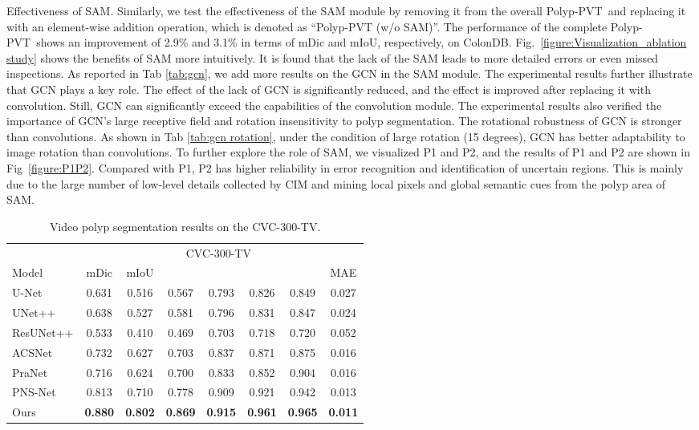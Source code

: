 \documentclass[journal]{IEEEtran}
\def\ourmodel{Polyp-PVT}
\begin{document}
\textcolor[RGB]{31,100,212}{Effectiveness of SAM.} Similarly, we test the effectiveness of the SAM module by removing it from the overall \ourmodel~and replacing it with an element-wise addition operation, which is denoted as ``Polyp-PVT (w/o SAM)''.
The performance of the complete \ourmodel~shows an improvement of 2.9\% and 3.1\% in terms of mDic and mIoU, respectively, on ColonDB.
Fig.~\ref{figure:Visualization_ablation study} shows the benefits of SAM more intuitively.
It is found that the lack of the SAM leads to more detailed errors or even missed inspections.
As reported in Tab \ref{tab:gcn}, we add more results on the GCN in the SAM module. The experimental results further illustrate that GCN plays a key role. The effect of the lack of GCN is significantly reduced, and the effect is improved after replacing it with convolution. Still, GCN can significantly exceed the capabilities of the convolution module. The experimental results also verified the importance of GCN's large receptive field and rotation insensitivity to polyp segmentation. The rotational robustness of GCN is stronger than convolutions.  As shown in Tab \ref{tab:gcn rotation}, under the condition of large rotation (15 degrees), GCN has better adaptability to image rotation than convolutions.
To further explore the role of SAM, we visualized P1 and P2, and the results of P1 and P2 are shown in Fig~\ref{figure:P1P2}. Compared with P1, P2 has higher reliability in error recognition and identification of uncertain regions. This is mainly due to the large number of low-level details collected by CIM and mining local pixels and global semantic cues from the polyp area of SAM. 



\begin{table}
 \centering
	\caption{Video polyp segmentation results on the CVC-300-TV.}
	\renewcommand{\arraystretch}{1}
	\setlength\tabcolsep{2.4pt}
	\small
    \begin{tabular}{l|ccccccc}
    \hline
     & \multicolumn{7}{c}{CVC-300-TV~\cite{bernal2012towards}} \\
\cline{2-8}    Model & mDic & mIoU &    &     &    &   & MAE\\
    \hline
    U-Net & 0.631  & 0.516  & 0.567  & 0.793  & 0.826   & 0.849   & 0.027 \\
    UNet++ & 0.638  & 0.527  & 0.581  & 0.796  & 0.831   & 0.847  & 0.024 \\
    ResUNet++ & 0.533  & 0.410  & 0.469  & 0.703  & 0.718   & 0.720  & 0.052 \\
    ACSNet & 0.732  & 0.627  & 0.703  & 0.837  & 0.871    & 0.875  & 0.016 \\
    PraNet & 0.716  & 0.624  & 0.700  & 0.833  & 0.852   & 0.904 & 0.016   \\
    PNS-Net & 0.813  & 0.710  & 0.778  & 0.909  & 0.921    & 0.942 & 0.013  \\
     \hline
     \rowcolor{gray!30}
    Ours & \textbf{0.880} & \textbf{0.802} & \textbf{0.869} & \textbf{0.915} & \textbf{0.961}  & \textbf{0.965} & \textbf{0.011}\\
    \hline
    \end{tabular}
      \label{tab:VPS2}
      \vspace{10pt}
\end{table}
\end{document}
